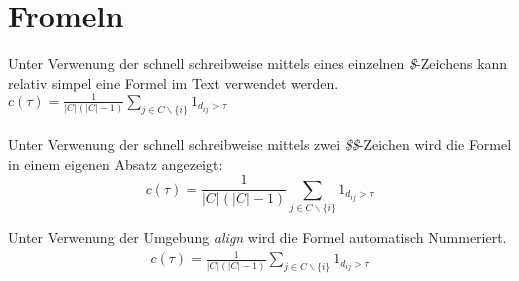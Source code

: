 \chapter{Fromeln}
Unter Verwenung der schnell schreibweise mittels eines einzelnen \emph{\$}-Zeichens kann relativ simpel eine Formel im Text verwendet werden.
$ c(\tau) =\frac{1}{|C|(|C|-1)} \sum_{j \in C\backslash \{i\}}1_{d_{ij}>\tau}$\\\\
Unter Verwenung der schnell schreibweise mittels zwei \emph{\$\$}-Zeichen wird die Formel in einem eigenen Absatz angezeigt:
$$ c(\tau) =\frac{1}{|C|(|C|-1)} \sum_{j \in C\backslash \{i\}}1_{d_{ij}>\tau}$$

Unter Verwenung der Umgebung \emph{align} wird die Formel automatisch Nummeriert.
\begin{align}
    c(\tau) =\frac{1}{|C|(|C|-1)} \sum_{j \in C\backslash \{i\}}1_{d_{ij}>\tau}
\end{align}